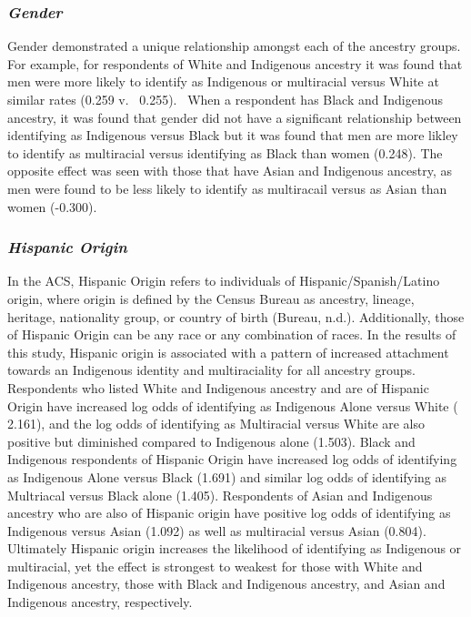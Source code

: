 \documentclass[
  12pt,
  letterpaper,
]{article}
\begin{document}
\subsubsection{\texorpdfstring{\emph{Gender}}{Gender}}\label{gender}

Gender demonstrated a unique relationship amongst each of the ancestry
groups. For example, for respondents of White and Indigenous ancestry it
was found that men were more likely to identify as Indigenous or
multiracial versus White at similar rates (0.259 v.~ 0.255).~ When a
respondent has Black and Indigenous ancestry, it was found that gender
did not have a significant relationship between identifying as
Indigenous versus Black but it was found that men are more likley to
identify as multiracial versus identifying as Black than women (0.248).
The opposite effect was seen with those that have Asian and Indigenous
ancestry, as men were found to be less likely to identify as multiracail
versus as Asian than women (-0.300).

\subsubsection{\texorpdfstring{\emph{Hispanic
Origin}}{Hispanic Origin}}\label{hispanic-origin}

In the ACS, Hispanic Origin refers to individuals of
Hispanic/Spanish/Latino origin, where origin is defined by the Census
Bureau as ancestry, lineage, heritage, nationality group, or country of
birth (Bureau, n.d.). Additionally, those of Hispanic Origin can be any
race or any combination of races. In the results of this study, Hispanic
origin is associated with a pattern of increased attachment towards an
Indigenous identity and multiraciality for all ancestry groups.
Respondents who listed White and Indigenous ancestry and are of Hispanic
Origin have increased log odds of identifying as Indigenous Alone versus
White ( 2.161), and the log odds of identifying as Multiracial versus
White are also positive but diminished compared to Indigenous alone
(1.503). Black and Indigenous respondents of Hispanic Origin have
increased log odds of identifying as Indigenous Alone versus Black
(1.691) and similar log odds of identifying as Multriacal versus Black
alone (1.405). Respondents of Asian and Indigenous ancestry who are also
of Hispanic origin have positive log odds of identifying as Indigenous
versus Asian (1.092) as well as multiracial versus Asian (0.804).
Ultimately Hispanic origin increases the likelihood of identifying as
Indigenous or multiracial, yet the effect is strongest to weakest for
those with White and Indigenous ancestry, those with Black and
Indigenous ancestry, and Asian and Indigenous ancestry, respectively.
\end{document}
